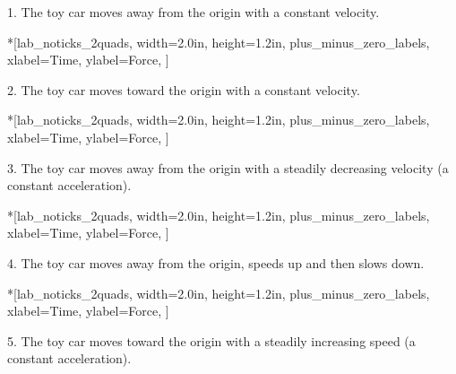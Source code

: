 1. The toy car moves away from the origin with a constant velocity.

\begin{lab_axis}*[lab_noticks_2quads,
	width=2.0in,  height=1.2in,
	plus_minus_zero_labels,
	xlabel=Time,
	ylabel=Force,
	]
\end{lab_axis}

2. The toy car moves toward the origin with a constant velocity.

\begin{lab_axis}*[lab_noticks_2quads,
	width=2.0in,  height=1.2in,
	plus_minus_zero_labels,
	xlabel=Time,
	ylabel=Force,
	]
\end{lab_axis}

3. The toy car moves away from the origin with a steadily decreasing velocity
(a constant acceleration).

\begin{lab_axis}*[lab_noticks_2quads,
	width=2.0in,  height=1.2in,
	plus_minus_zero_labels,
	xlabel=Time,
	ylabel=Force,
	]
\end{lab_axis}


4. The toy car moves away from the origin, speeds up and then slows down.

\begin{lab_axis}*[lab_noticks_2quads,
	width=2.0in,  height=1.2in,
	plus_minus_zero_labels,
	xlabel=Time,
	ylabel=Force,
	]
\end{lab_axis}

5. The toy car moves toward the origin with a steadily increasing speed (a
constant acceleration).


